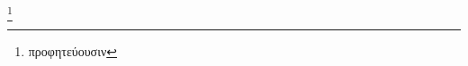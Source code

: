 \documentclass[]{article}
\begin{document}
\makeatletter


\begin{greek}

\footnote{\hspace{12cm}προφητεύουσιν}
\end{greek}
\end{document}
